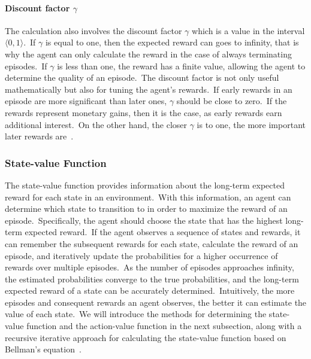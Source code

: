 \documentclass[../xlapes02]{subfiles}
\begin{document}
    \paragraph{Discount factor $\gamma$}\label{par:discount-factor}
    The calculation also involves the discount factor $\gamma$ which is a value in the interval $\langle 0, 1 \rangle$.\ If $\gamma$ is equal to one, then the expected reward can goes to infinity, that is why the agent can only calculate the reward in the case of always terminating episodes.\ If $\gamma$ is less than one, the reward has a finite value, allowing the agent to determine the quality of an episode.\ The discount factor is not only useful mathematically but also for tuning the agent's rewards.\ If early rewards in an episode are more significant than later ones, $\gamma$ should be close to zero.\ If the rewards represent monetary gains, then it is the case, as early rewards earn additional interest.\ On the other hand, the closer $\gamma$ is to one, the more important later rewards are~\cite{rao2022foundations, sutton2018reinforcement, perotto:hal-02363599}.

    \subsubsection{State-value Function}\label{subsubsec:state-value-function}
    The state-value function provides information about the long-term expected reward for each state in an environment.\ With this information, an agent can determine which state to transition to in order to maximize the reward of an episode.\ Specifically, the agent should choose the state that has the highest long-term expected reward.\ If the agent observes a sequence of states and rewards, it can remember the subsequent rewards for each state, calculate the reward of an episode, and iteratively update the probabilities for a higher occurrence of rewards over multiple episodes.\ As the number of episodes approaches infinity, the estimated probabilities converge to the true probabilities, and the long-term expected reward of a state can be accurately determined.\ Intuitively, the more episodes and consequent rewards an agent observes, the better it can estimate the value of each state.\ We will introduce the methods for determining the state-value function and the action-value function in the next subsection, along with a recursive iterative approach for calculating the state-value function based on Bellman's equation~\cite{FITMT25127}.
\end{document}
